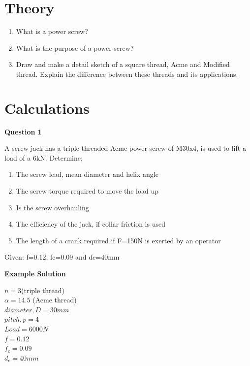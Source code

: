 \documentclass[a4paper, fleqn]{article}
\begin{document}
\section*{Theory}

\begin{enumerate}
    \item What is a power screw?
    \item What is the purpose of a power screw?
    \item Draw and make a detail sketch of a square thread, Acme and Modified thread. Explain the difference between these threads and its applications.
\end{enumerate}

\newpage
\section*{Calculations}
\vspace{10pt}

\textbf{Question 1}

A screw jack has a triple threaded Acme power screw of M30x4, is used to lift a load of a 6kN. Determine;

\begin{enumerate}[label=(\roman*)]
    \item The screw lead, mean diameter and helix angle
    \item The screw torque required to move the load up
    \item Is the screw overhauling
    \item The efficiency of the jack, if collar friction is used
    \item The length of a crank required if F=150N is exerted by an operator
\end{enumerate}

Given: f=0.12, fc=0.09 and dc=40mm

\vspace{10pt}
\textbf{Example Solution}
\vspace{10pt}

$n = 3$(triple thread)\\
$\alpha = 14.5$ (Acme thread)\\
$diameter,D = 30mm$\\
$pitch,p = 4$\\
$Load = 6000N$\\
$f = 0.12$\\
$f_c = 0.09$\\
$d_c = 40mm$\\
\vspace{10pt}
\end{document}
